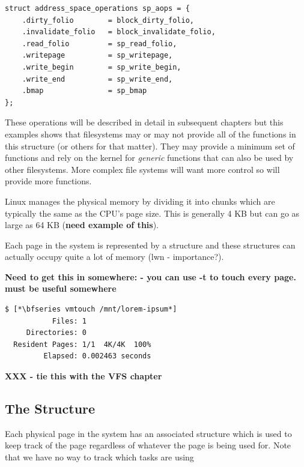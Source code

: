 \begin{lstlisting}
struct address_space_operations sp_aops = {
    .dirty_folio        = block_dirty_folio,
    .invalidate_folio   = block_invalidate_folio,
    .read_folio         = sp_read_folio,
    .writepage          = sp_writepage,
    .write_begin        = sp_write_begin,
    .write_end          = sp_write_end,
    .bmap               = sp_bmap
};
\end{lstlisting}

\noindent
These operations will be described in detail in subsequent chapters but this examples shows that filesystems may or may not provide all of the functions in this structure (or others for that matter). They may provide a minimum set of functions and rely on the kernel for \textit{generic} functions that can also be used by other filesystems. More complex file systems will want more control so will provide more functions.

Linux manages the physical memory by dividing it into  chunks which are typically the same as the CPU's page size. This is generally 4 KB but can go as large as 64 KB (\textbf{need example of this}).

Each page in the system is represented by a  structure and these structures can actually occupy quite a lot of memory (lwn - importance?).

\noindent
\textbf{Need to get this in somewhere: - you can use -t to touch every page. must be useful somewhere}

\begin{lstlisting}
$ [*\bfseries vmtouch /mnt/lorem-ipsum*]
           Files: 1
     Directories: 0
  Resident Pages: 1/1  4K/4K  100%
         Elapsed: 0.002463 seconds
\end{lstlisting}

\noindent
\textbf{XXX - tie this with the VFS chapter}


\subsection{The  Structure}

Each physical page in the system has an associated  structure which is used to keep track of the page regardless of whatever the page is being used for. Note that we have no way to track which tasks are using


